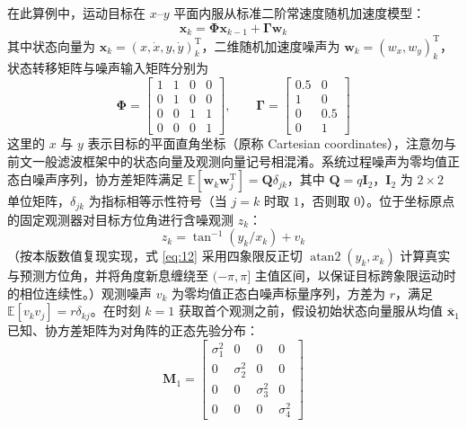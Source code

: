 在此算例中，运动目标在 $x\text{--}y$ 平面内服从标准二阶常速度随机加速度模型：
\begin{equation}\label{eq:11}
\bm{x}_k = \bm{\Phi}\bm{x}_{k-1} + \bm{\Gamma}\bm{w}_k
\end{equation}
其中状态向量为 $\bm{x}_k = (x, \dot{x}, y, \dot{y})_k^{\mathrm{T}}$，二维随机加速度噪声为 $\bm{w}_k = (w_x, w_y)_k^{\mathrm{T}}$，状态转移矩阵与噪声输入矩阵分别为
\begin{equation*}
\bm{\Phi} = \begin{bmatrix} 1 & 1 & 0 & 0 \\ 0 & 1 & 0 & 0 \\ 0 & 0 & 1 & 1 \\ 0 & 0 & 0 & 1 \end{bmatrix}, \qquad \bm{\Gamma} = \begin{bmatrix} 0.5 & 0 \\ 1 & 0 \\ 0 & 0.5 \\ 0 & 1 \end{bmatrix}
\end{equation*}
这里的 $x$ 与 $y$ 表示目标的平面直角坐标（原称 Cartesian coordinates），注意勿与前文一般滤波框架中的状态向量及观测向量记号相混淆。系统过程噪声为零均值正态白噪声序列，协方差矩阵满足 $\mathbb{E}[\bm{w}_k \bm{w}_j^{\mathrm{T}}] = \bm{Q}\delta_{jk}$，其中 $\bm{Q} = q\bm{I}_2$，$\bm{I}_2$ 为 $2 \times 2$ 单位矩阵，$\delta_{jk}$ 为指标相等示性符号（当 $j = k$ 时取 $1$，否则取 $0$）。位于坐标原点的固定观测器对目标方位角进行含噪观测 $z_k$：
\begin{equation}\label{eq:12}
z_k = \tan^{-1}(y_k / x_k) + v_k
\end{equation}
（按本版数值复现实现，式 \eqref{eq:12} 采用四象限反正切 $\operatorname{atan2}(y_k, x_k)$ 计算真实与预测方位角，并将角度新息缠绕至 $(-\pi, \pi]$ 主值区间，以保证目标跨象限运动时的相位连续性。）观测噪声 $v_k$ 为零均值正态白噪声标量序列，方差为 $r$，满足 $\mathbb{E}[v_k v_j] = r\delta_{kj}$。在时刻 $k = 1$ 获取首个观测之前，假设初始状态向量服从均值 $\bar{\bm{x}}_1$ 已知、协方差矩阵为对角阵的正态先验分布：
\begin{equation*}
\bm{M}_1 = \begin{bmatrix} \sigma_1^2 & 0 & 0 & 0 \\ 0 & \sigma_2^2 & 0 & 0 \\ 0 & 0 & \sigma_3^2 & 0 \\ 0 & 0 & 0 & \sigma_4^2 \end{bmatrix}
\end{equation*}

